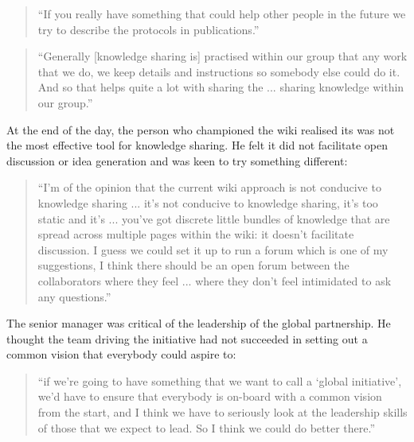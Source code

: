 \begin{quote}
\small
\enquote{If you really have something that could help other people in the future we try to describe the protocols in publications.} \\
\end{quote}

\begin{quote}
\small
\enquote{Generally [knowledge sharing is] practised within our group that any work that we do, we keep details and instructions so somebody else could do it. And so that helps quite a lot with sharing the ... sharing knowledge within our group.} \\
\end{quote}

At the end of the day, the person who championed the wiki realised its was not the most effective tool for knowledge sharing. He felt it did not facilitate open discussion or idea generation and was keen to try something different:

\begin{quote}
\small
\enquote{I'm of the opinion that the current wiki approach is not conducive to knowledge sharing ... it's not conducive to knowledge sharing, it’s too static and it's ... you've got discrete little bundles of knowledge that are spread across multiple pages within the wiki: it doesn't facilitate discussion. I guess we could set it up to run a forum which is one of my suggestions, I think there should be an open forum between the collaborators where they feel ... where they don't feel intimidated to ask any questions.} \\
\end{quote}

The senior manager was critical of the leadership of the global partnership. He thought the team driving the initiative had not succeeded in setting out a common vision that everybody could aspire to:

\begin{quote}
\small
\enquote{if we're going to have something that we want to call a \enquote{global initiative}, we'd have to ensure that everybody is on-board with a common vision from the start, and I think we have to seriously look at the leadership skills of those that we expect to lead. So I think we could do better there.} \\
\end{quote}

